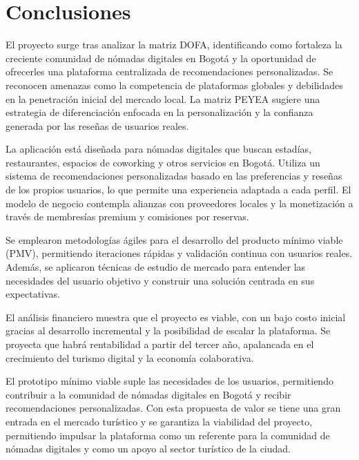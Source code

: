 \section{Conclusiones}
El proyecto surge tras analizar la matriz DOFA, identificando como fortaleza la creciente comunidad de nómadas digitales en Bogotá y la oportunidad de ofrecerles una plataforma centralizada de recomendaciones personalizadas. Se reconocen amenazas como la competencia de plataformas globales y debilidades en la penetración inicial del mercado local. La matriz PEYEA sugiere una estrategia de diferenciación enfocada en la personalización y la confianza generada por las reseñas de usuarios reales.

La aplicación está diseñada para nómadas digitales que buscan estadías, restaurantes, espacios de coworking y otros servicios en Bogotá. Utiliza un sistema de recomendaciones personalizadas basado en las preferencias y reseñas de los propios usuarios, lo que permite una experiencia adaptada a cada perfil. El modelo de negocio contempla alianzas con proveedores locales y la monetización a través de membresías premium y comisiones por reservas.

Se emplearon metodologías ágiles para el desarrollo del producto mínimo viable (PMV), permitiendo iteraciones rápidas y validación continua con usuarios reales. Además, se aplicaron técnicas de estudio de mercado para entender las necesidades del usuario objetivo y construir una solución centrada en sus expectativas.

El análisis financiero muestra que el proyecto es viable, con un bajo costo inicial gracias al desarrollo incremental y la posibilidad de escalar la plataforma. Se proyecta que habrá rentabilidad a partir del tercer año, apalancada en el crecimiento del turismo digital y la economía colaborativa.

El prototipo mínimo viable suple las necesidades de los usuarios, permitiendo contribuir a la comunidad de nómadas digitales en Bogotá y recibir recomendaciones personalizadas. Con esta propuesta de valor se tiene una gran entrada en el mercado turístico y se garantiza la viabilidad del proyecto, permitiendo impulsar la plataforma como un referente para la comunidad de nómadas digitales y como un apoyo al sector turístico de la ciudad.
